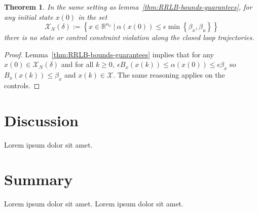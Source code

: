 \documentclass[conference]{IEEEtran}
\newtheorem{theorem}{Theorem}[section]
\theoremstyle{definition}
\theoremstyle{remark}
\def\cal#1{\mathcal{#1}}
\newcommand{\R}{\mathbb{R}}
\begin{document}
\begin{theorem}
	In the same setting as lemma~\ref{thm:RRLB-bounds-guarantees}, for any initial state $x(0)$ in the set
	$$\cal{X}_N(\delta):=\left\{x\in\R^{n_x}~|~\alpha(x(0))\leq\epsilon\min\left\{\beta_x,\beta_u\right\}\right\}$$
	there is no state or control constraint violation along the closed loop trajectories.
\end{theorem}

\begin{proof}
	Lemma~\ref{thm:RRLB-bounds-guarantees} implies that for any $x(0)\in\cal{X}_N(\delta)$ and for all $k\geq 0,~\epsilon B_x(x(k))\leq\alpha(x(0))\leq\epsilon\beta_x$ so $B_x(x(k))\leq \beta_x$ and $x(k)\in\cal{X}$.
	The same reasoning applies on the controls.
\end{proof}

\section{Discussion}
Lorem ipsum dolor sit amet.
\section{Summary}
Lorem ipsum dolor sit amet.
\appendix
Lorem ipsum dolor sit amet.

\printbibliography

\end{document}
